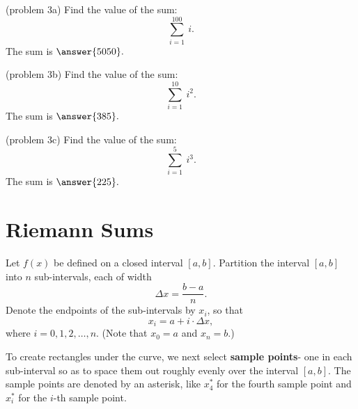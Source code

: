 \documentclass{ximera}
\begin{document}
\begin{problem}(problem 3a)
Find the value of the sum:
\[\sum_{i = 1}^{100} \ i.\]
The sum is $\answer{5050}.$
\end{problem}

\begin{problem}(problem 3b)
Find the value of the sum:
\[\sum_{i = 1}^{10} \ i^2.\]
The sum is $\answer{385}.$
\end{problem}

\begin{problem}(problem 3c)
Find the value of the sum:
\[\sum_{i = 1}^5 \ i^3.\]
The sum is $\answer{225}.$
\end{problem}

\section{Riemann Sums}


Let $f(x)$ be defined on a closed interval $[a,b]$. Partition the interval 
$[a,b]$ into $n$ sub-intervals, each of width
\[\Delta x = \frac{b-a}{n}.\]
 Denote the endpoints of the sub-intervals by $x_i$, 
so that 
\[x_i =  a + i\cdot \Delta x,\]
 where $i = 0, 1, 2, \ldots, n$. (Note that $x_0 = a$ and $x_n = b$.)  

\begin{image}
\end{image}


To create rectangles under the curve, we next select \textbf{sample points}- one in each sub-interval
so as to space them out roughly evenly over the interval $[a,b]$. The sample points are denoted by an asterisk,
like $x_4^*$ for the fourth sample point and $x_i^*$ for the $i$-th sample point.
\end{document}
